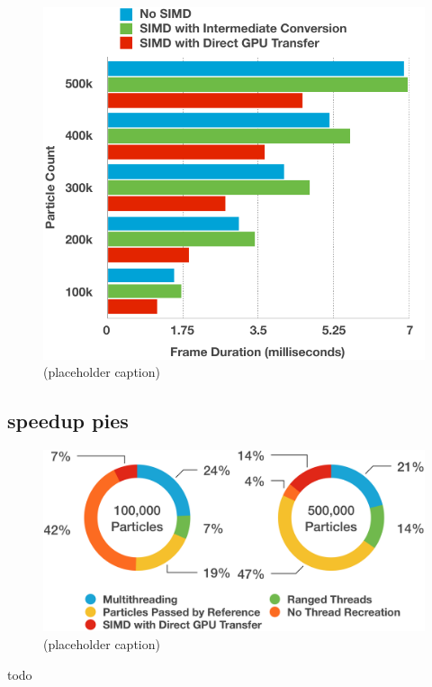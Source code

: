 \documentclass[11pt, a4paper, twocolumn]{article}
\begin{document}
\begin{figure}[h]
\includegraphics[width=\linewidth]{nosimd-simdwic-simdwdirect}
\caption{(placeholder caption)}
\label{fig:nosimd-simdwic-simdwdirect}
\end{figure}

\subsection{speedup pies}

\begin{figure}[h]
\includegraphics[width=\linewidth]{speedup-pies}
\caption{(placeholder caption)}
\label{fig:speedup-pies}
\end{figure}

todo
\end{document}
